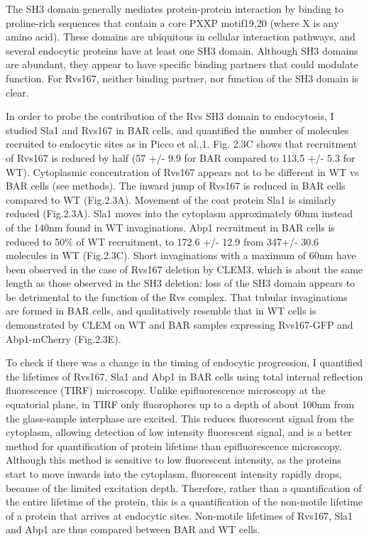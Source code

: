 	\vspace{5mm}
The SH3 domain generally mediates protein-protein interaction by binding to proline-rich sequences that contain a core PXXP motif19,20 (where X is any amino acid). These domains are ubiquitous in cellular interaction pathways, and several endocytic proteins have at least one SH3 domain. Although SH3 domains are abundant, they appear to have specific binding partners that could modulate function. For Rvs167, neither binding partner, nor function of the SH3 domain is clear. 

	\vspace{5mm}
In order to probe the contribution of the Rvs SH3 domain to endocytosis, I studied Sla1 and Rvs167 in BAR cells, and quantified the number of molecules recruited to endocytic sites as in Picco et al.,1. Fig. 2.3C shows that recruitment of Rvs167 is reduced by half (57 +/- 9.9 for BAR compared to 113.5 +/- 5.3 for WT). Cytoplasmic concentration of Rvs167 appears not to be different in WT vs BAR cells (see methods). The inward jump of Rvs167 is reduced in BAR cells compared to WT (Fig.2.3A). Movement of the coat protein Sla1 is similarly reduced (Fig.2.3A). Sla1 moves into the cytoplasm approximately 60nm instead of the 140nm found in WT invaginations. Abp1 recruitment in BAR cells is reduced to 50\% of WT recruitment, to 172.6 +/- 12.9 from 347+/- 30.6 molecules in WT (Fig.2.3C). Short invaginations with a maximum of 60nm have been observed in the case of Rvs167 deletion by CLEM3, which is about the same length as those observed in the SH3 deletion: loss of the SH3 domain appears to be detrimental to the function of the Rvs complex. That tubular invaginations are formed in BAR cells, and qualitatively resemble that in WT cells is demonstrated by CLEM on WT and BAR samples expressing Rvs167-GFP and Abp1-mCherry (Fig.2.3E). 

	\vspace{5mm}
To check if there was a change in the timing of endocytic progression, I quantified the lifetimes of Rvs167, Sla1 and Abp1 in BAR cells using total internal reflection fluorescence (TIRF) microscopy. Unlike epifluorescence microscopy at the equatorial plane, in TIRF only fluorophores up to a depth of about 100nm from the glass-sample interphase are excited. This reduces fluorescent signal from the cytoplasm, allowing detection of low intensity fluorescent signal, and is a better method for quantification of protein lifetime than epifluorescence microscopy. Although this method is sensitive to low fluorescent intensity, as the proteins start to move inwards into the cytoplasm, fluorescent intensity rapidly drops, because of the limited excitation depth. Therefore, rather than a quantification of the entire lifetime of the protein, this is a quantification of the non-motile lifetime of a protein that arrives at endocytic sites. Non-motile lifetimes of Rvs167, Sla1 and Abp1 are thus compared between BAR and WT cells. 

